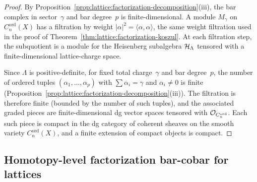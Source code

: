 \begin{proof}
By Proposition~\ref{prop:lattice:factorization-decomposition}(iii),
the bar complex in sector~$\gamma$ and bar degree~$p$ is
finite-dimensional.  A module $M_\gamma$ on
$C_n^{\mathrm{ord}}(X)$ has a filtration by weight
$|\alpha|^2 = \langle\alpha,\alpha\rangle$, the same weight
filtration used in the proof of
Theorem~\ref{thm:lattice:factorization-koszul}.  At each
filtration step, the subquotient is a module for the Heisenberg
subalgebra $\mathcal{H}_\Lambda$ tensored with a finite-dimensional
lattice-charge space.

Since $\Lambda$ is positive-definite, for fixed total
charge~$\gamma$ and bar degree~$p$, the number of ordered tuples
$(\alpha_1, \ldots, \alpha_p)$ with $\sum \alpha_i = \gamma$ and
$\alpha_i \neq 0$ is finite
(Proposition~\ref{prop:lattice:factorization-decomposition}(iii)).
The filtration is therefore finite (bounded by the number of such
tuples), and the associated graded pieces are finite-dimensional
dg vector spaces tensored with $\mathcal{O}_{C_n^{\mathrm{ord}}}$.  Each
such piece is compact in the dg category of coherent sheaves on
the smooth variety $C_n^{\mathrm{ord}}(X)$, and a finite extension
of compact objects is compact.
\end{proof}


\subsection{Homotopy-level factorization bar-cobar for lattices}

